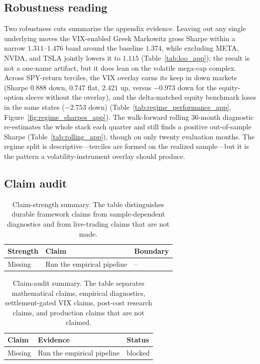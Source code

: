 \subsection{Robustness reading}

Two robustness cuts summarize the appendix evidence. Leaving out any single underlying
moves the VIX-enabled Greek Markowitz gross Sharpe within a narrow \(1.311\)--\(1.476\)
band around the baseline \(1.374\), while excluding META, NVDA, and TSLA jointly lowers it
to \(1.115\) (Table~\ref{tab:loo_app}); the result is not a one-name artifact, but it does
lean on the volatile mega-cap complex. Across SPY-return terciles, the VIX overlay earns
its keep in down markets (Sharpe \(0.888\) down, \(0.747\) flat, \(2.421\) up, versus
\(-0.973\) down for the equity-option sleeve without the overlay), and the delta-matched
equity benchmark loses in the same states (\(-2.753\) down)
(Table~\ref{tab:regime_performance_app}, Figure~\ref{fig:regime_sharpes_app}). The
walk-forward rolling 36-month diagnostic re-estimates the whole stack each quarter and
still finds a positive out-of-sample Sharpe (Table~\ref{tab:rolling_app}), though on only
twenty evaluation months. The
regime split is descriptive---terciles are formed on the realized sample---but it is the
pattern a volatility-instrument overlay should produce.

\subsection{Claim audit}

\begin{table}[H]
\centering
\scriptsize
{}
  {\resizebox{\textwidth}{!}{}}
  {\begin{tabular}{lll}\toprule Strength & Claim & Boundary \\\midrule Missing & Run the empirical pipeline & -- \\\bottomrule\end{tabular}}
\caption{Claim-strength summary. The table distinguishes durable framework claims from
sample-dependent diagnostics and from live-trading claims that are not made.}
\label{tab:claim_strength}
\end{table}

\begin{table}[H]
\centering
\scriptsize
{}
  {\resizebox{\textwidth}{!}{}}
  {\begin{tabular}{lll}\toprule Claim & Evidence & Status \\\midrule
  Missing & Run the empirical pipeline & blocked \\\bottomrule\end{tabular}}
\caption{Claim-audit summary. The table separates mathematical claims, empirical
diagnostics, settlement-gated VIX claims, post-cost research claims, and production claims
that are not claimed.}
\label{tab:claim_audit}
\end{table}

